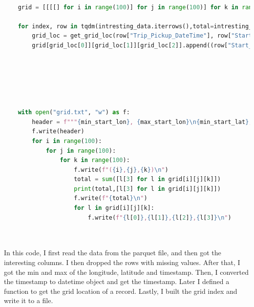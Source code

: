 \documentclass{article}
\begin{document}
\begin{lstlisting}[language=Python, caption=Task 1, label=task1, breaklines=true]
    
    grid = [[[[] for i in range(100)] for j in range(100)] for k in range(100)]
    
    for index, row in tqdm(intresting_data.iterrows(),total=intresting_data.shape[0]):
        grid_loc = get_grid_loc(row["Trip_Pickup_DateTime"], row["Start_Lon"], row["Start_Lat"])
        grid[grid_loc[0]][grid_loc[1]][grid_loc[2]].append((row["Start_Lon"], row["Start_Lat"],row["Trip_Pickup_DateTime"].value, row["Total_Amt"]))
        
        
    
        
        
        
    with open("grid.txt", "w") as f:
        header = f"""{min_start_lon}, {max_start_lon}\n{min_start_lat}, {max_start_lat}\n{min_trip_pickup_datetime}, {max_trip_pickup_datetime}\n"""
        f.write(header)
        for i in range(100):
            for j in range(100):
                for k in range(100):
                    f.write(f"({i},{j},{k})\n")
                    total = sum([l[3] for l in grid[i][j][k]])
                    print(total,[l[3] for l in grid[i][j][k]])
                    f.write(f"{total}\n")
                    for l in grid[i][j][k]:
                        f.write(f"{l[0]},{l[1]},{l[2]},{l[3]}\n")
                        
                        
\end{lstlisting}


In this code, I first read the data from the parquet file, 
and then got the interesting columns. 
I then dropped the rows with missing values. 
After that, I got the min and max of the longitude, latitude and timestamp. 
Then, I converted the timestamp to datetime object and get the timestamp. Later I defined a function to get the grid location of a record. Lastly, I built the grid index and write it to a file.
\end{document}

